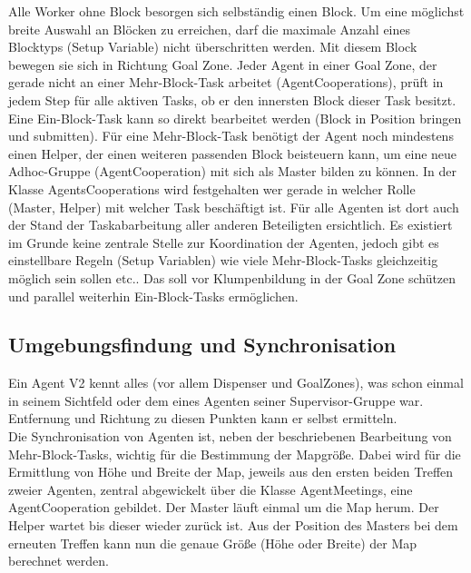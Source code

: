 \documentclass[runningheads]{llncs}
\begin{document}
Alle Worker ohne Block besorgen sich selbständig einen Block. Um eine möglichst breite Auswahl an Blöcken zu erreichen, darf die maximale Anzahl eines Blocktyps (Setup Variable) nicht überschritten werden. Mit diesem Block bewegen sie sich in Richtung Goal Zone. Jeder Agent in einer Goal Zone, der gerade nicht an einer Mehr-Block-Task arbeitet (AgentCooperations), prüft in jedem Step für alle aktiven Tasks, ob er den innersten Block dieser Task besitzt. Eine Ein-Block-Task kann so direkt bearbeitet werden (Block in Position bringen und submitten). Für eine Mehr-Block-Task benötigt der Agent noch mindestens einen Helper, der einen weiteren passenden Block beisteuern kann, um eine neue Adhoc-Gruppe (AgentCooperation) mit sich als Master bilden zu können. In der Klasse AgentsCooperations wird festgehalten wer gerade in welcher Rolle (Master, Helper) mit welcher Task beschäftigt ist. Für alle Agenten ist dort auch der Stand der Taskabarbeitung aller anderen Beteiligten ersichtlich. Es existiert im Grunde keine zentrale Stelle zur Koordination der Agenten, jedoch gibt es einstellbare Regeln (Setup Variablen) wie viele Mehr-Block-Tasks gleichzeitig möglich sein sollen etc.. Das soll vor Klumpenbildung in der Goal Zone schützen und parallel weiterhin Ein-Block-Tasks ermöglichen.

\subsection{Umgebungsfindung und Synchronisation}
Ein Agent V2 kennt alles (vor allem Dispenser und GoalZones), was schon einmal in seinem Sichtfeld oder dem eines Agenten seiner Supervisor-Gruppe war. Entfernung und Richtung zu diesen Punkten kann er selbst ermitteln.\\

Die Synchronisation von Agenten ist, neben der beschriebenen Bearbeitung von Mehr-Block-Tasks, wichtig für die Bestimmung der Mapgröße. Dabei wird für die Ermittlung von Höhe und Breite der Map, jeweils aus den ersten beiden Treffen zweier Agenten, zentral abgewickelt über die Klasse AgentMeetings, eine AgentCooperation gebildet. Der Master läuft einmal um die Map herum. Der Helper wartet bis dieser wieder zurück ist. Aus der Position des Masters bei dem erneuten Treffen kann nun die genaue Größe (Höhe oder Breite) der Map berechnet werden. 
\end{document}
